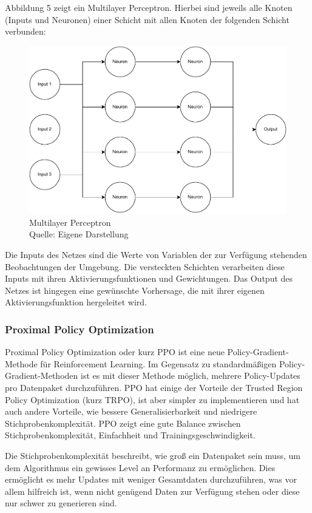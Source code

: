 Abbildung 5 zeigt ein Multilayer Perceptron. Hierbei sind jeweils alle Knoten (Inputs und Neuronen) einer Schicht mit allen Knoten der folgenden Schicht verbunden:
\nopagebreak
\begin{figure}[H]
	\includegraphics[width=1\textwidth]{Bilder/mlp2.drawio} 
	\caption[Multilayer Perceptron]{Multilayer Perceptron\\ Quelle: Eigene Darstellung}
\end{figure}	

Die Inputs des Netzes sind die Werte von Variablen der zur Verfügung stehenden Beobachtungen der Umgebung. Die versteckten Schichten verarbeiten diese Inputs mit ihren Aktivierungsfunktionen und Gewichtungen. Das Output des Netzes ist hingegen eine gewünschte Vorhersage, die mit ihrer eigenen Aktivierungsfunktion hergeleitet wird.
\subsubsection{Proximal Policy Optimization}
Proximal Policy Optimization oder kurz PPO ist eine neue Policy-Gradient-Methode für Reinforcement Learning. Im Gegensatz zu standardmäßigen Policy-Gradient-Methoden ist es mit dieser Methode möglich, mehrere Policy-Updates pro Datenpaket durchzuführen. PPO hat einige der Vorteile der Trusted Region Policy Optimization (kurz TRPO), ist aber simpler zu implementieren und hat auch andere Vorteile, wie bessere Generalisierbarkeit und niedrigere Stichprobenkomplexität. PPO zeigt eine gute Balance zwischen Stichprobenkomplexität, Einfachheit und Trainingsgeschwindigkeit. \cite[S. 1]{schulman_proximal_2017}

Die Stichprobenkomplexität beschreibt, wie groß ein Datenpaket sein muss, um dem Algorithmus ein gewisses Level an Performanz zu ermöglichen. Dies ermöglicht es mehr Updates mit weniger Gesamtdaten durchzuführen, was vor allem hilfreich ist, wenn nicht genügend Daten zur Verfügung stehen oder diese nur schwer zu generieren sind.

